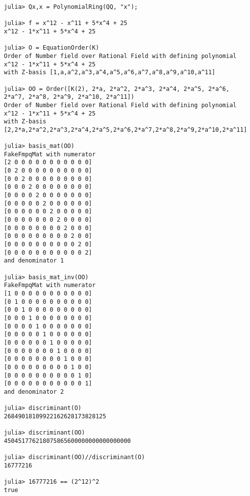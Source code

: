 \documentclass[a4paper,10pt]{article}
\begin{document}
\begin{verbatim}
julia> Qx,x = PolynomialRing(QQ, "x");

julia> f = x^12 - x^11 + 5*x^4 + 25
x^12 - 1*x^11 + 5*x^4 + 25

julia> O = EquationOrder(K)
Order of Number field over Rational Field with defining polynomial x^12 - 1*x^11 + 5*x^4 + 25
with Z-basis [1,a,a^2,a^3,a^4,a^5,a^6,a^7,a^8,a^9,a^10,a^11]

julia> OO = Order([K(2), 2*a, 2*a^2, 2*a^3, 2*a^4, 2*a^5, 2*a^6, 2*a^7, 2*a^8, 2*a^9, 2*a^10, 2*a^11])
Order of Number field over Rational Field with defining polynomial x^12 - 1*x^11 + 5*x^4 + 25
with Z-basis [2,2*a,2*a^2,2*a^3,2*a^4,2*a^5,2*a^6,2*a^7,2*a^8,2*a^9,2*a^10,2*a^11]

julia> basis_mat(OO)
FakeFmpqMat with numerator
[2 0 0 0 0 0 0 0 0 0 0 0]
[0 2 0 0 0 0 0 0 0 0 0 0]
[0 0 2 0 0 0 0 0 0 0 0 0]
[0 0 0 2 0 0 0 0 0 0 0 0]
[0 0 0 0 2 0 0 0 0 0 0 0]
[0 0 0 0 0 2 0 0 0 0 0 0]
[0 0 0 0 0 0 2 0 0 0 0 0]
[0 0 0 0 0 0 0 2 0 0 0 0]
[0 0 0 0 0 0 0 0 2 0 0 0]
[0 0 0 0 0 0 0 0 0 2 0 0]
[0 0 0 0 0 0 0 0 0 0 2 0]
[0 0 0 0 0 0 0 0 0 0 0 2]
and denominator 1

julia> basis_mat_inv(OO)
FakeFmpqMat with numerator
[1 0 0 0 0 0 0 0 0 0 0 0]
[0 1 0 0 0 0 0 0 0 0 0 0]
[0 0 1 0 0 0 0 0 0 0 0 0]
[0 0 0 1 0 0 0 0 0 0 0 0]
[0 0 0 0 1 0 0 0 0 0 0 0]
[0 0 0 0 0 1 0 0 0 0 0 0]
[0 0 0 0 0 0 1 0 0 0 0 0]
[0 0 0 0 0 0 0 1 0 0 0 0]
[0 0 0 0 0 0 0 0 1 0 0 0]
[0 0 0 0 0 0 0 0 0 1 0 0]
[0 0 0 0 0 0 0 0 0 0 1 0]
[0 0 0 0 0 0 0 0 0 0 0 1]
and denominator 2

julia> discriminant(O)
26849018109922162628173828125

julia> discriminant(OO)
450451776218075865600000000000000000

julia> discriminant(OO)//discriminant(O)
16777216

julia> 16777216 == (2^12)^2
true
\end{verbatim}
\end{document}
